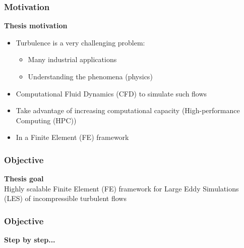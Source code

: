 \begin{frame}
\frametitle{Motivation}
\vfill
{\bf Thesis motivation }\\
\begin{itemize}
\item<2-> Turbulence is a very challenging problem:
\begin{itemize}
\item Many industrial applications
\item Understanding the phenomena (physics)
\end{itemize}
\item<3-> Computational Fluid Dynamics (CFD) to simulate such flows
\item<4-> Take advantage of increasing computational capacity (High-performance Computing (HPC))
\item<5-> In a Finite Element (FE) framework
\end{itemize}
\vfill
\end{frame}
\begin{frame}
\frametitle{Objective}
\vfill
{\bf Thesis goal }\\
Highly scalable Finite Element (FE) framework for Large Eddy Simulations (LES) of incompressible turbulent flows\\
\vspace{0.5cm}
\vfill
\end{frame}
\begin{frame}
\frametitle{Objective}
\vfill
\textbf{Step by step...}
\begin{itemize}
\end{itemize}
\vfill
\end{frame}
